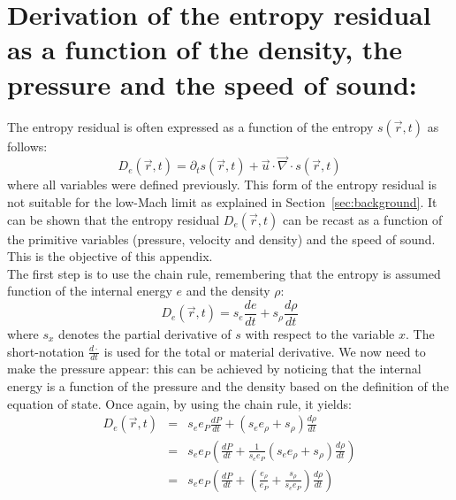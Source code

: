 \documentclass[preprint,10pt]{elsarticle}
\renewcommand{\div}{\vec{\nabla}\! \cdot \!}
\newcommand{\sct}[1]{Section~\ref{#1}}                   %
\begin{document}
\section{Derivation of the entropy residual as a function of the density, the pressure and the speed of sound:} \label{app:ent_res}

The entropy residual is often expressed as a function of the entropy $s(\vec{r},t)$ as follows:
%
\begin{equation}
D_e(\vec{r},t) = \partial_t s (\vec{r},t) + \vec{u} \cdot \div s (\vec{r},t) \nonumber
\end{equation}
%
where all variables were defined previously. This form of the entropy residual is not suitable for the low-Mach limit as explained in \sct{sec:background}. It can be shown that the entropy residual $D_e(\vec{r},t)$ can be recast as a function of the primitive variables (pressure, velocity and density) and the speed of sound. This is the objective of this appendix. \\
The first step is to use the chain rule, remembering that the entropy is assumed function of the internal energy $e$ and the density $\rho$:
%
\begin{equation}
D_e(\vec{r},t) = s_e \frac{d e}{dt} + s_{\rho} \frac{d \rho}{dt} \nonumber
\end{equation}
%
where $s_x$ denotes the partial derivative of $s$ with respect to the variable $x$. The short-notation $\frac{d \cdot}{dt}$ is used for the total or material derivative. We now need to make the pressure appear: this can be achieved by noticing that the internal energy is a function of the pressure and the density based on the definition of the equation of state. Once again, by using the chain rule, it yields:
%
\begin{eqnarray}
D_e(\vec{r},t) &=&  s_e e_P \frac{d P}{dt} + ( s_e e_{\rho} + s_{\rho} ) \frac{d \rho}{dt} \nonumber \\
&=& s_e e_P \left( \frac{d P}{dt} + \frac{1}{s_e e_P} ( s_e e_{\rho} + s_{\rho} ) \frac{d \rho}{dt} \right) \nonumber \\
&=& s_e e_P \left( \frac{d P}{dt} + ( \frac{e_{\rho}}{e_P} + \frac{s_{\rho}}{s_e e_P} ) \frac{d \rho}{dt} \right) \nonumber 
\end{eqnarray}
\end{document}
